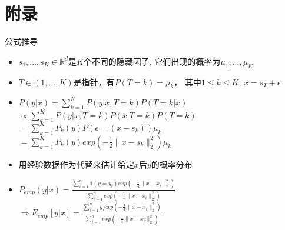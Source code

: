 \documentclass[unknownkeysallowed]{beamer}
\begin{document}
\section{附录}
\begin{frame}
  \begin{alertblock}{公式推导}
    \begin{itemize}
      \item $s_1, ..., s_K\in \mathbb{R}^d$是$K$个不同的隐藏因子, 它们出现的概率为$\mu_1, ..., \mu_K$
      \item $T\in (1, ..., K)$是指针，有$P(T = k) = \mu_k$， 其中$1\leq k\leq K$, $x = s_T + \epsilon$
      \item $P(y|x) = \sum_{k=1}^K P(y|x, T = k)P(T = k|x)$
      \hspace*{1.1cm} $\propto\sum_{k=1}^K P(y|x, T = k)P(x|T = k)P(T = k)$
      \hspace*{1.1cm} $=\sum_{k=1}^K P_k(y)P(\epsilon = (x - s_k))\mu_k$
      \hspace*{1.1cm} $=\sum_{k=1}^K P_k(y)exp(-\frac{1}{2} \parallel x - s_k\parallel_2^2)\mu_k$
      \item 用经验数据作为代替来估计给定$x$后$y$的概率分布
      \item $P_{emp}(y|x) = \frac{\sum_{i=1}^n \mathbb{1}(y = y_i)exp(-\frac{1}{4}\parallel x - x_i \parallel_2^2)}{\sum_{i=1}^n exp(-\frac{1}{4}\parallel x - x_i \parallel_2^2)}$
      $\Rightarrow E_{emp}[y|x] = \frac{\sum_{i=1}^n y_i exp(-\frac{1}{4}\parallel x - x_i \parallel_2^2)}{\sum_{i=1}^n exp(-\frac{1}{4}\parallel x - x_i \parallel_2^2)}$
    \end{itemize}
  \end{alertblock}
\end{frame}
\end{document}
